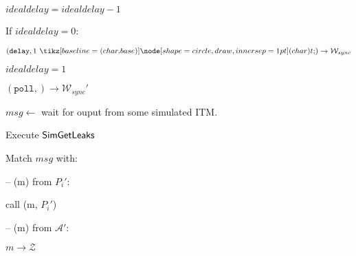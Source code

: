 \begin{bbox}[title={Algorithm $\msf{Poll}$}]

\begin{renumerate}

  \item $idealdelay = idealdelay - 1$
  
  \item If $idealdelay = 0$:
   
  \qquad \Send $(\texttt{delay}, 1 \token) \rightarrow \mathcal{W}_{sync}$

  \qquad $idealdelay = 1$

  \item \Send $(\texttt{poll},) \rightarrow \mathcal{W}_{sync}'$
  
  \item $msg \leftarrow$ wait for ouput from some simulated ITM.

  \item Execute ${\mathsf {SimGetLeaks}}$

\item Match $msg$ with:

-- \OnInput (m) from $P_i'$:
     
   \qquad call (m, $P_i'$)

-- \OnInput (m) from $\mathcal{A}'$:
   
   \qquad \Send $m \rightarrow \mathcal{Z}$
   
\end{renumerate}

%
%
%
%
%
%
%
%
%

\end{bbox}
